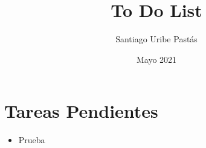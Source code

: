 \documentclass{article}
\title{To Do List}
\author{Santiago Uribe Pastás}
\date{Mayo 2021}
\begin{document}
\maketitle

\section{Tareas Pendientes}
\begin{itemize}
    \item Prueba
\end{itemize}
\end{document}
